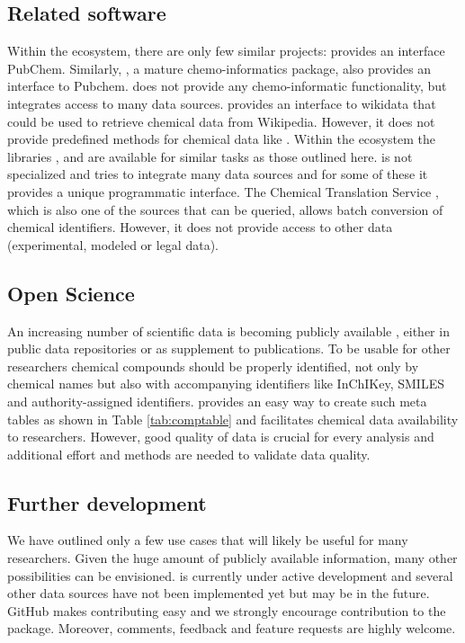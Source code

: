 \documentclass[article, shortnames]{jss}\usepackage[]{graphicx}\usepackage[]{color}
\begin{document}
\subsection[Related software]{Related software}
Within the  ecosystem, there are only few similar projects:
 \citep{rpubchem_2014} provides an interface PubChem.
Similarly,  \citep{chemminer_2008}, a mature chemo-informatics package, also provides an interface to Pubchem. 
 does not provide any chemo-informatic functionality, but integrates access to many data sources.
 \citep{wikidatar_2016} provides an interface to wikidata that could be used to retrieve chemical data from Wikipedia.
However, it does not provide predefined methods for chemical data like .
Within the  ecosystem the libraries  \citep{pubchempy},  \citep{chemspipy} and  \citep{cirpy} are available for similar tasks as those outlined here.
 is not specialized and tries to integrate many data sources and for some of these it provides a unique programmatic interface.
The Chemical Translation Service \citep{Wohlgemuth_Haldiya_Willighagen_Kind_Fiehn_2010}, which is also one of the sources that can be queried, allows batch conversion of chemical identifiers.
However, it does not provide access to other data (experimental, modeled or legal data).


\subsection[Open Science]{Open Science}
An increasing number of scientific data is becoming publicly available \citep{Gewin_2016, Reichman_Jones_Schildhauer_2011,Boyle_Guha_2011}, either in public data repositories or as supplement to publications.
To be usable for other researchers chemical compounds should be properly identified, not only by chemical names but also with accompanying identifiers like InChIKey, SMILES and authority-assigned identifiers.
 provides an easy way to create such meta tables as shown in Table \ref{tab:comptable} and facilitates chemical data availability to researchers.
However, good quality of data is crucial for every analysis \citep{Stieger_2014} and additional effort and methods are needed to validate data quality.

\subsection[Further development]{Further development}
We have outlined only a few use cases that will likely be useful for many researchers.
Given the huge amount of publicly available information, many other possibilities can be envisioned.
 is currently under active development and several other data sources have not been implemented yet but may be in the future.
GitHub makes contributing easy and we strongly encourage contribution to the package.
Moreover, comments, feedback and feature requests are highly welcome.
\end{document}
